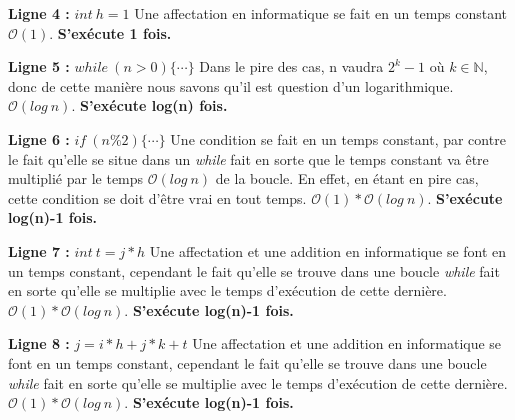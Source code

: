 \documentclass[12pt]{article}
\begin{document}
        \noindent \textbf{Ligne 4 :} \( int \: h = 1 \) \newline
        Une affectation en informatique se fait en un temps constant
        \( \mathcal{O}(1) \). \newline
		\textbf{S'exécute 1 fois.} \newline

        \noindent \textbf{Ligne 5 :} \( while \: (n>0) \{ \cdots \} \) \newline
        Dans le pire des cas, n vaudra \( 2^k - 1 \) où \(k \in \mathbb{N} \), donc de cette manière nous         savons qu'il est question d'un logarithmique.
        \( \mathcal{O}(log \: n) \). \newline
		\textbf{S'exécute log(n) fois.} \newline

        \noindent \textbf{Ligne 6 :}  \( if \: (n\%2)\{ \cdots \} \) \newline
        Une condition se fait en un temps constant, par contre le fait qu'elle se situe dans un \textit{while} fait en sorte que le temps constant va être multiplié par le temps \( \mathcal{O}(log \: n) \) de la boucle. En effet, en étant en pire cas, cette condition se doit d'être vrai en tout temps.
        \( \mathcal{O}(1)*\mathcal{O}(log \: n) \). \newline
		\textbf{S'exécute log(n)-1 fois.} \newline

        \noindent \textbf{Ligne 7 :} \( int \: t = j*h \) \newline
        Une affectation et une addition en informatique se font en un temps constant, cependant le fait qu'elle se trouve dans une boucle \textit{while} fait en sorte qu'elle se multiplie avec le temps d'exécution de cette dernière.
        \( \mathcal{O}(1)*\mathcal{O}(log \: n) \). \newline
		\textbf{S'exécute log(n)-1 fois.} \newline

        \noindent \textbf{Ligne 8 :} \( j = i*h + j*k + t \) \newline
  	    Une affectation et une addition en informatique se font en un temps constant, cependant le fait qu'elle se trouve dans une boucle \textit{while} fait en sorte qu'elle se multiplie avec le temps d'exécution de cette dernière.
        \( \mathcal{O}(1)*\mathcal{O}(log \: n) \). \newline
 		\textbf{S'exécute log(n)-1 fois.} \newline
\end{document}
